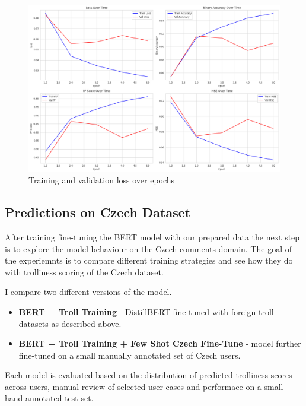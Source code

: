 \documentclass[twoside]{ctuthesis}
\theoremstyle{plain}
\theoremstyle{definition}
\theoremstyle{note}
\begin{document}
\begin{figure}[htbp]
	\centering
	\includegraphics[scale=0.35]{figures/training_full.png}
	\caption{Training and validation loss over epochs}
	\label{fig:training_stats}
\end{figure}

\subsection{Predictions on Czech Dataset}
After training fine-tuning the BERT model with our prepared data the next step is to explore the model behaviour on the Czech comments domain. The goal of the experiemnts is to compare different training strategies and see how they do with trolliness scoring of the Czech dataset.\par
I compare two different versions of the model. 
\begin{itemize} 
	\item \textbf{BERT + Troll Training} - DistillBERT fine tuned with foreign troll datasets as described above. 
	\item \textbf{BERT + Troll Training + Few Shot Czech Fine-Tune} - model further fine-tuned on a small manually annotated set of Czech users. 
\end{itemize}
Each model is evaluated based on the distribution of predicted trolliness scores across users, manual review of selected user cases and performace on a small hand annotated test set.
\end{document}
